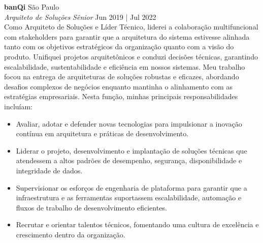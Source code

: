 \documentclass[a4paper]{article}
\begin{document}
\textbf{banQi}                                 \hfill São Paulo             \\
\textit{Arquiteto de Soluções Sênior}            \hfill Jun 2019 |
Jul 2022   \\
\vspace{1mm}
Como Arquiteto de Soluções e Líder Técnico, liderei a colaboração multifuncional com stakeholders para garantir que a arquitetura do sistema estivesse alinhada tanto com os objetivos estratégicos da organização quanto com a visão do produto. 
Unifiquei projetos arquitetônicos e conduzi decisões técnicas, garantindo escalabilidade, sustentabilidade e eficiência em nossos sistemas. 
Meu trabalho focou na entrega de arquiteturas de soluções robustas e eficazes, abordando desafios complexos de negócios enquanto mantinha o alinhamento com as estratégias empresariais. 
\newline
Nesta função, minhas principais responsabilidades incluíam:
\vspace{-2mm} 
\begin{itemize}
\setlength\itemsep{-1mm}
    \item Avaliar, adotar e defender novas tecnologias para impulsionar a inovação contínua em arquitetura e práticas de desenvolvimento. 
\item Liderar o projeto, desenvolvimento e implantação de soluções técnicas que atendessem a altos padrões de desempenho, segurança, disponibilidade e integridade de dados. 
\item Supervisionar os esforços de engenharia de plataforma para garantir que a infraestrutura e as ferramentas suportassem escalabilidade, automação e fluxos de trabalho de desenvolvimento eficientes. 
\item Recrutar e orientar talentos técnicos, fomentando uma cultura de excelência e crescimento dentro da organização. 
\end{itemize}
\vspace{-1mm}
\end{document}
